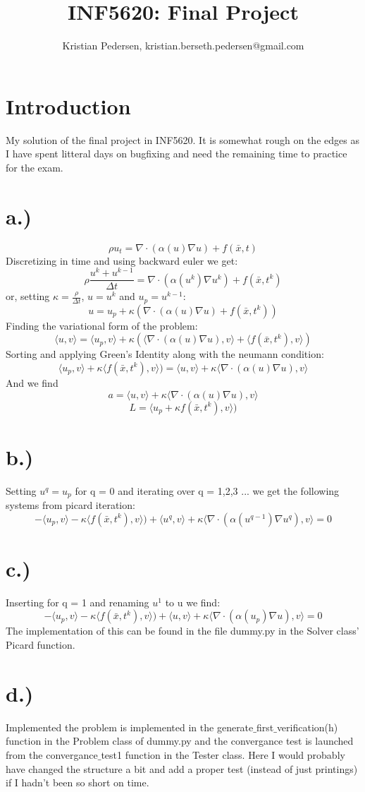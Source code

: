 \documentclass[11pt]{amsart}
\author{Kristian Pedersen, kristian.berseth.pedersen@gmail.com}
\theoremstyle{definition}
\def\D{\nabla}
\def\r{\rho}
\def\d{\Delta}
\def\k{\kappa}
\def\la{\langle}
\def\ra{\rangle}
\begin{document}
\title[INF5620]{INF5620: Final Project}

\maketitle
\section{Introduction}
My solution of the final project in INF5620. It is somewhat rough on the edges as I have spent litteral days on bugfixing and need the remaining time to practice for the exam.
\section{a.)}
$$\r u_t = \D \cdot (\alpha (u) \D u) + f(\bar{x},t)$$
Discretizing in time and using backward euler we get:
$$\r \frac{u^k + u^{k-1}}{\d t} = \D \cdot (\alpha (u^k) \D u^k) + f(\bar{x},t^k)$$
or, setting $\k = \frac{\r}{\d t}$, $u = u^k$ and $u_p = u^{k-1}$:
$$u = u_p + \k( \D \cdot (\alpha (u) \D u) + f(\bar{x},t^k))$$
Finding the variational form of the problem:
$$\la u,v \ra = \la u_p,v \ra + \k(\la \D \cdot (\alpha (u) \D u),v \ra + \la f(\bar{x},t^k),v \ra)$$
Sorting and applying Green's Identity along with the neumann condition:
$$\la u_p,v \ra + \k \la f(\bar{x},t^k),v \ra) = \la u,v \ra + \k \la \D \cdot (\alpha (u) \D u),v \ra$$
And we find 
$$a = \la u,v \ra + \k \la \D \cdot (\alpha (u) \D u),v \ra$$
$$L = \la u_p + \k f(\bar{x},t^k),v \ra)$$

\section{b.)}
Setting $u^q = u_p$ for q = 0 and iterating over q = 1,2,3 ... we get the following systems from picard iteration:
$$- \la u_p,v \ra - \k \la f(\bar{x},t^k),v \ra)  + \la u^q,v \ra + \k \la \D \cdot (\alpha (u^{q-1}) \D u^q),v \ra = 0$$

\section{c.)}
Inserting for q = 1 and renaming $u^1$ to u we find:
$$-\la u_p,v \ra - \k \la f(\bar{x},t^k),v \ra)  + \la u,v \ra + \k \la \D \cdot (\alpha (u_p) \D u),v \ra = 0$$
The implementation of this can be found in the file dummy.py in the Solver class' Picard function.

\section{d.)}
Implemented the problem is implemented in the generate$\_$first$\_$verification(h) function in the Problem class of dummy.py and the convergance test is launched from the convergance$\_$test1 function in the Tester class. Here I would probably have changed the structure a bit and add a proper test (instead of just printings) if I hadn't been so short on time.
\end{document}
